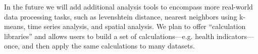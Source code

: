 \documentclass{acm_proc_article-sp}
\begin{document}
In the future we will add additional analysis tools to encompass more real-world data processing tasks, such as levenshtein distance, nearest neighbors using k-means, time series analysis, and spatial analysis.  We plan to offer ``calculation libraries'' and allows users to build a set of calculations---e.g. health indicators---once, and then apply the same calculations to many datasets.


%

%
%

\balancecolumns
\end{document}
